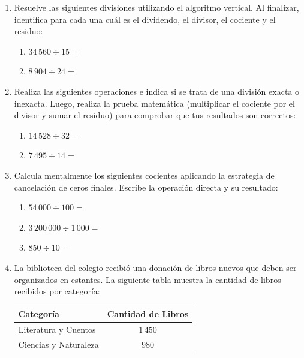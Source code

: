 \documentclass[12pt, letterpaper]{article}
\begin{document}
	\begin{enumerate}[itemsep=0.8cm]
		
		\item Resuelve las siguientes divisiones utilizando el algoritmo vertical. Al finalizar, identifica para cada una cuál es el dividendo, el divisor, el cociente y el residuo:
		\begin{enumerate}[label=\alph*., itemsep=0.2cm, topsep=0.2cm]
			\item $34\,560 \div 15 = $
			\item $8\,904 \div 24 = $
		\end{enumerate}
		
		\item Realiza las siguientes operaciones e indica si se trata de una división exacta o inexacta. Luego, realiza la prueba matemática (multiplicar el cociente por el divisor y sumar el residuo) para comprobar que tus resultados son correctos:
		\begin{enumerate}[label=\alph*., itemsep=0.2cm, topsep=0.2cm]
			\item $14\,528 \div 32 = $
			\item $7\,495 \div 14 = $
		\end{enumerate}
		
		\item Calcula mentalmente los siguientes cocientes aplicando la estrategia de cancelación de ceros finales. Escribe la operación directa y su resultado:
		\begin{enumerate}[label=\alph*., itemsep=0.2cm, topsep=0.2cm]
			\item $54\,000 \div 100 = $
			\item $3\,200\,000 \div 1\,000 = $
			\item $850 \div 10 = $
		\end{enumerate}
		
		\item La biblioteca del colegio recibió una donación de libros nuevos que deben ser organizados en estantes. La siguiente tabla muestra la cantidad de libros recibidos por categoría:
		
		\begin{table}[h]
			\centering
			\begin{tabular}{lc}
				\toprule
				\textbf{Categoría} & \textbf{Cantidad de Libros} \\
				\midrule
				Literatura y Cuentos & $1\,450$ \\
				Ciencias y Naturaleza & $980$ \\
				\bottomrule
			\end{tabular}
		\end{table}
		

\end{enumerate}
\end{document}
